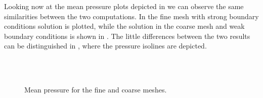 Looking now at the mean pressure plots depicted in  we can observe the same similarities between the two computations. In  the fine mesh with strong boundary conditions solution is plotted, while the solution in the coarse mesh and weak boundary conditions is shown in . The little differences between the two results can be distinguished in , where the pressure isolines are depicted.
\begin{figure}[h!]
  \centering
  \\
  \\
  \caption{Mean pressure for the fine and coarse meshes.}
  \label{fig-NACA_mean_press}
\end{figure}

